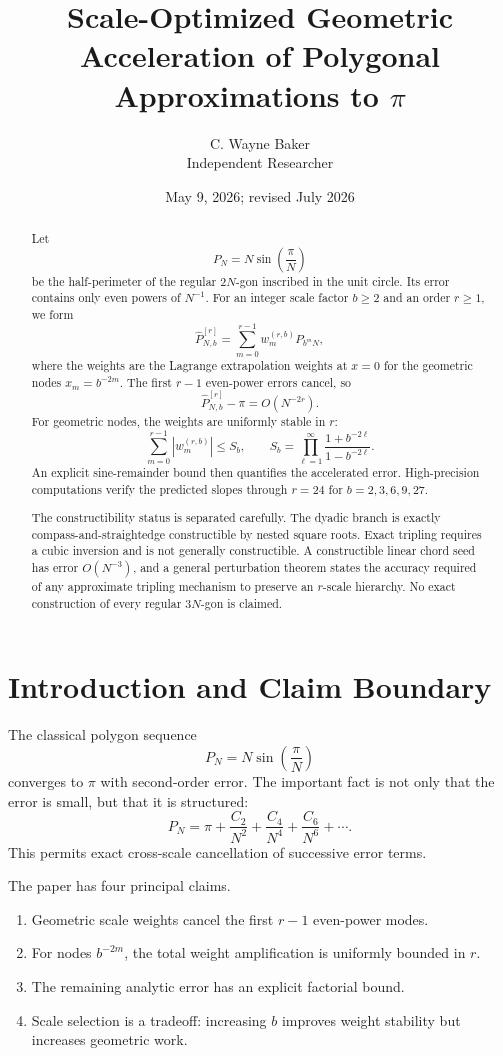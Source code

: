\documentclass[11pt]{article}
\title{\textbf{Scale-Optimized Geometric Acceleration of Polygonal Approximations to $\pi$}}
\author{C. Wayne Baker\\Independent Researcher}
\date{May 9, 2026; revised July 2026}
\theoremstyle{remark}
\newcommand{\Pacc}{\widehat P}
\begin{document}
\maketitle

\begin{abstract}
Let
\[
  P_N=N\sin\!\left(\frac{\pi}{N}\right)
\]
be the half-perimeter of the regular $2N$-gon inscribed in the unit circle.
Its error contains only even powers of $N^{-1}$.  For an integer scale
factor $b\ge2$ and an order $r\ge1$, we form
\[
  \Pacc^{[r]}_{N,b}
  =\sum_{m=0}^{r-1}w_m^{(r,b)}P_{b^mN},
\]
where the weights are the Lagrange extrapolation weights at $x=0$ for the
geometric nodes $x_m=b^{-2m}$.  The first $r-1$ even-power errors cancel,
so
\[
  \Pacc^{[r]}_{N,b}-\pi=O(N^{-2r}).
\]
For geometric nodes, the weights are uniformly stable in $r$:
\[
  \sum_{m=0}^{r-1}|w_m^{(r,b)}|
  \le
  S_b,
  \qquad
  S_b=\prod_{\ell=1}^{\infty}
  \frac{1+b^{-2\ell}}{1-b^{-2\ell}}.
\]
An explicit sine-remainder bound then quantifies the accelerated error.
High-precision computations verify the predicted slopes through $r=24$ for
$b=2,3,6,9,27$.

The constructibility status is separated carefully.  The dyadic branch is
exactly compass-and-straightedge constructible by nested square roots.  Exact
tripling requires a cubic inversion and is not generally constructible.  A
constructible linear chord seed has error $O(N^{-3})$, and a general
perturbation theorem states the accuracy required of any approximate tripling
mechanism to preserve an $r$-scale hierarchy.  No exact construction of every
regular $3N$-gon is claimed.
\end{abstract}

\section{Introduction and Claim Boundary}

The classical polygon sequence
\[
  P_N=N\sin\!\left(\frac{\pi}{N}\right)
\]
converges to $\pi$ with second-order error.  The important fact is not only
that the error is small, but that it is structured:
\[
  P_N
  =\pi+\frac{C_2}{N^2}+\frac{C_4}{N^4}+\frac{C_6}{N^6}+\cdots.
\]
This permits exact cross-scale cancellation of successive error terms.

The paper has four principal claims.
\begin{enumerate}[label=(\roman*)]
  \item Geometric scale weights cancel the first $r-1$ even-power modes.
  \item For nodes $b^{-2m}$, the total weight amplification is uniformly
        bounded in $r$.
  \item The remaining analytic error has an explicit factorial bound.
  \item Scale selection is a tradeoff: increasing $b$ improves weight
        stability but increases geometric work.
\end{enumerate}
\end{document}
